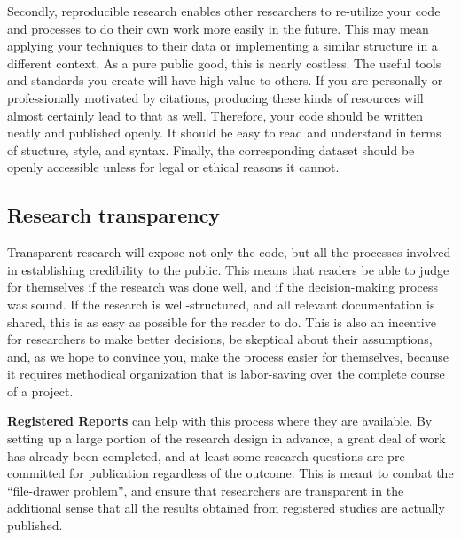 Secondly, reproducible research
enables other researchers to re-utilize your code and processes
to do their own work more easily in the future.
This may mean applying your techniques to their data
or implementing a similar structure in a different context.
As a pure public good, this is nearly costless.
The useful tools and standards you create will have high value to others.
If you are personally or professionally motivated by citations,
producing these kinds of resources will almost certainly lead to that as well.
Therefore, your code should be written neatly and published openly.
It should be easy to read and understand in terms of stucture, style, and syntax.
Finally, the corresponding dataset should be openly accessible
unless for legal or ethical reasons it cannot.

\subsection{Research transparency}

Transparent research will expose not only the code, but all the processes involved in establishing credibility to the public.
This means that readers be able to judge for themselves if the research was done well,
and if the decision-making process was sound.
If the research is well-structured, and all relevant documentation is shared,
this is as easy as possible for the reader to do.
This is also an incentive for researchers to make better decisions,
be skeptical about their assumptions,
and, as we hope to convince you, make the process easier for themselves,
because it requires methodical organization that is labor-saving over the complete course of a project.

\textbf{Registered Reports} can help with this process where they are available.
By setting up a large portion of the research design in advance,
a great deal of work has already been completed,
and at least some research questions are pre-committed for publication regardless of the outcome.
This is meant to combat the ``file-drawer problem'',
and ensure that researchers are transparent in the additional sense that
all the results obtained from registered studies are actually published.

